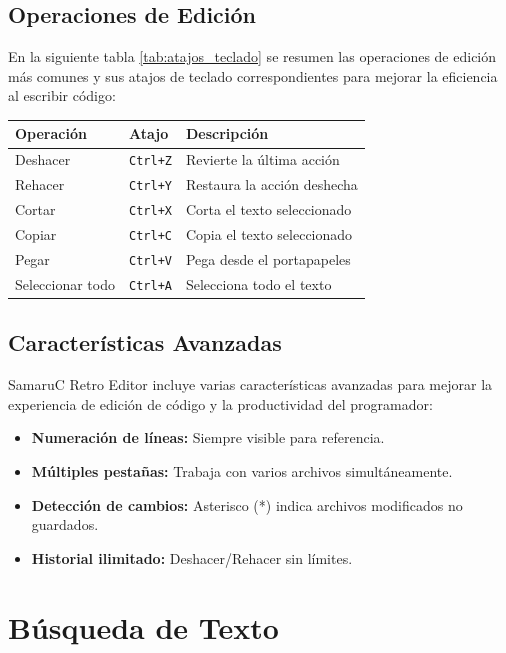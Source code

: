 \documentclass[../../main.tex]{subfiles}
\begin{document}
\subsection{Operaciones de Edición}

En la siguiente tabla \ref{tab:atajos_teclado} se resumen las operaciones de edición más comunes y sus atajos de teclado correspondientes para mejorar la eficiencia al escribir código:

\begin{tabular}{|l|l|l|}
    \hline
    \textbf{Operación} & \textbf{Atajo} & \textbf{Descripción} \\
    \hline
    Deshacer & \lstinline|Ctrl+Z| & Revierte la última acción \\
    \hline
    Rehacer & \lstinline|Ctrl+Y| & Restaura la acción deshecha \\
    \hline
    Cortar & \lstinline|Ctrl+X| & Corta el texto seleccionado \\
    \hline
    Copiar & \lstinline|Ctrl+C| & Copia el texto seleccionado \\
    \hline
    Pegar & \lstinline|Ctrl+V| & Pega desde el portapapeles \\
    \hline
    Seleccionar todo & \lstinline|Ctrl+A| & Selecciona todo el texto \\
    \hline
\end{tabular}
\label{tab:atajos_teclado}

\subsection{Características Avanzadas}

SamaruC Retro Editor incluye varias características avanzadas para mejorar la experiencia de edición de código y la productividad del programador:
\begin{itemize}
     \item \textbf{Numeración de líneas:} Siempre visible para referencia.
     \item \textbf{Múltiples pestañas:} Trabaja con varios archivos simultáneamente.
     \item \textbf{Detección de cambios:} Asterisco (*) indica archivos modificados no guardados.
     \item \textbf{Historial ilimitado:} Deshacer/Rehacer sin límites.
\end{itemize}

\clearpage

\section{Búsqueda de Texto}
\end{document}
